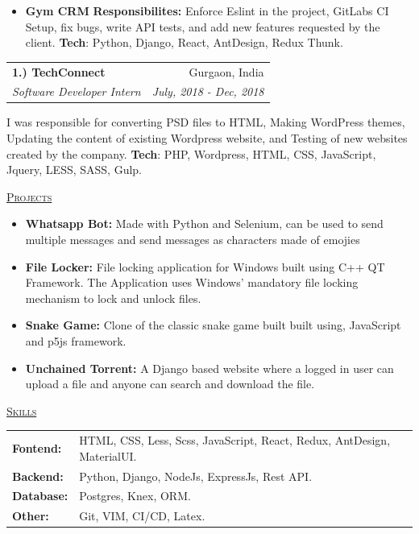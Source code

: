 \documentclass[11pt, a4paper]{article}
\begin{document}
\begin{flushleft}
\begin{itemize}
    \item \textbf{Gym CRM}
    \newline
    \textbf{Responsibilites:} Enforce Eslint in the project, GitLabs CI Setup, fix bugs, write API tests, and add new features requested by the client.
    \newline
    \textbf{Tech}: Python, Django, React, AntDesign, Redux Thunk.
\end{itemize}

\setlength\tabcolsep{0pt}
\begin{tabularx}{\textwidth}{X r}
    \large{\textbf{1.) TechConnect}} & Gurgaon, India\\
    \textit{Software Developer Intern}  & \textit {July, 2018 - Dec, 2018}\\
\end{tabularx}
\newline
\newline
I was responsible for converting PSD files to HTML, Making WordPress themes, Updating the content of existing Wordpress website, and Testing of new websites created by the company.
\newline
\textbf{Tech}: PHP, Wordpress, HTML, CSS, JavaScript, Jquery, LESS, SASS, Gulp.
\newline
\end{flushleft}
\begin{flushleft}
    \uline{\textsc{\large{Projects}}\hfill}
    \begin{itemize}
        \item \textbf{Whatsapp Bot:} Made with Python and Selenium, can be used to send multiple messages and send messages as characters made of emojies
        \item \textbf{File Locker:} File locking application for Windows built using C++ QT Framework. The Application uses Windows’ mandatory file locking mechanism to lock and unlock files.
        \item \textbf{Snake Game:} Clone of the classic snake game built built using, JavaScript and p5js framework.
        \item \textbf{Unchained Torrent:} A Django based website where a logged in user can upload a file and anyone can search and download the file.
    \end{itemize}
\end{flushleft}

\begin{flushleft}
    \uline{\textsc{\large{Skills}}\hfill}
    \newline
    \newline
    \begin{tabular}{l l}
        \textbf{Fontend: } & HTML, CSS, Less, Scss, JavaScript, React, Redux, AntDesign, MaterialUI.\\
        \textbf{Backend: } & Python, Django, NodeJs, ExpressJs, Rest API.\\
        \textbf{Database: } & Postgres, Knex, ORM.\\
        \textbf{Other: } & Git, VIM, CI/CD, Latex.\\
    \end{tabular}
\end{flushleft}
\end{document}
